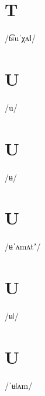 \documentclass[10pt,a4paper,twoside]{book}
\begin{document}
\section*{T}

\begin{multicols}{3}
 {/t͡suˈχʌǁ/} {}
\end{multicols}

\section*{U}

\begin{multicols}{3}
 {/u/} {}
\end{multicols}

\section*{U}

\begin{multicols}{3}
 {/ʉ/} {}
\end{multicols}

\section*{U}

\begin{multicols}{3}
 {/ʉˈʌmʌtʼ/} {}
\end{multicols}

\section*{U}

\begin{multicols}{3}
 {/ʉǀ/} {}
\end{multicols}

\section*{U}

\begin{multicols}{3}
 {/ˈʉǀʌm/} {}
\end{multicols}
\end{document}
